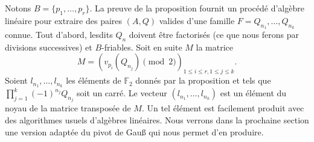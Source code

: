 Notons $B = \{p_1, \dots, p_r\}$. La preuve de la proposition fournit un
procédé d'algèbre linéaire pour extraire des paires $(A, Q)$ valides d'une
famille $F = Q_{n_1}, \dots, Q_{n_k}$ connue.  Tout d'abord, lesdits $Q_n$
doivent être factorisés (ce que nous ferons par divisions successives) et
$B$-friables. Soit en suite $M$ la matrice \[ M = \left(v_{p_i}(Q_{n_j})
\pmod{2}\right)_{1\leq i \leq r, 1\leq j \leq k}.\] Soient $l_{n_1}, \dots,
l_{n_k}$ les éléments de $\mathbb{F}_2$ donnés par la proposition et tels que
$\prod_{j=1}^k (-1)^{n_j} Q_{n_j}$ soit un carré. Le vecteur $(l_{n_1}, \dots,
l_{n_k})$ est un élément du noyau de la matrice transposée de $M$. Un tel
élément est facilement produit avec des algorithmes usuels d'algèbres
linéaires. Nous verrons dans la prochaine section une version adaptée du pivot
de Gau\ss{} qui nous permet d'en produire.
